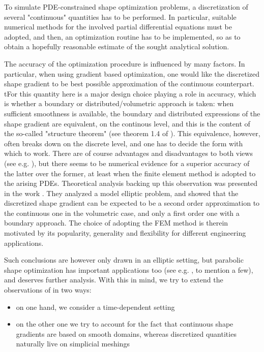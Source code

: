 \documentclass[english,a4paper,9pt,oneside]{scrbook}	%
\theoremstyle{break}
\theoremstyle{remark}
\begin{document}
To simulate PDE-constrained shape optimization problems, a discretization of several "continuous" quantities has to be performed. In particular, suitable numerical methods for the involved partial differential equations must be adopted, and then, an optimization routine has to be implemented, so as to obtain a hopefully reasonable estimate of the sought analytical solution.

The accuracy of the optimization procedure is influenced by many factors. In particular, when using gradient based optimization, one would like the discretized shape gradient to be best possible approximation of the continuous counterpart. tFor this quantity here is a major design choice playing a role in accuracy, which is whether a boundary or distributed/volumetric approach is taken: when sufficient smoothness is available, the boundary and distributed expressions of the shape gradient are equivalent, on the continous level, and this is the content of the so-called "structure theorem" (see theorem 1.4 of \cite{avg_adj}). This equivalence, however, often breaks down on the discrete level, and one has to decide the form with which to work. There are of course advantages and disadvantages to both views (see e.g. \cite{avg_adj}), but there seems to be numerical evidence for a superior accuracy of the latter over the former, at least when the finite element method is adopted to the arising PDEs. Theoretical analysis backing up this observation was presented in the work \cite{paganini}. They analyzed a model elliptic problem, and showed that the discretized shape gradient can be expected to be a second order approximation to the continuous one in the volumetric case, and only a first order one with a boundary approach. The choice of adopting the FEM method is therein motivated by its popularity, generality and flexibility for different engineering applications.

Such conclusions are however only drawn in an elliptic setting, but parabolic shape optimization has important applications too (see e.g. \cite{lindemann2}, \cite{harbrecht} to mention a few), and deserves further analysis. With this in mind, we try to extend the observations of \cite{paganini} in two ways: 

\begin{itemize}
\item on one hand, we consider a time-dependent setting
\item on the other one we try to account for the fact that continuous shape gradients are based on smooth domains, whereas discretized quantities naturally live on simplicial meshings
\end{itemize}
\end{document}

